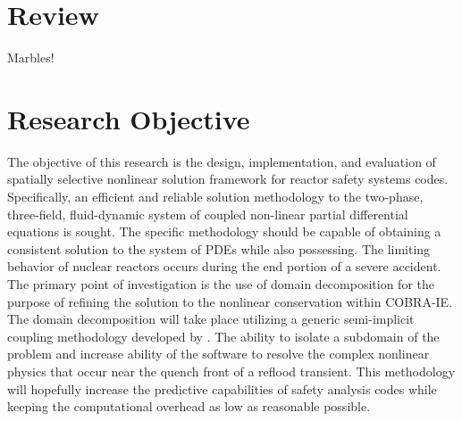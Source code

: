 \section{Review}
\label{sect:review}
Marbles!
\section{Research Objective}
The objective of this research is the design, implementation, and evaluation of spatially selective nonlinear solution framework for reactor safety systems codes.
Specifically, an efficient and reliable solution methodology to the two-phase, three-field, fluid-dynamic system of coupled non-linear partial differential equations is sought.
The specific methodology should be capable of obtaining a consistent solution to the system of PDEs while also possessing.
\cite{Aktas1996}
The limiting behavior of nuclear reactors occurs during the end portion of a severe accident.
The primary point of investigation is the use of domain decomposition for the purpose of refining the solution to the nonlinear conservation within COBRA-IE.
The domain decomposition will take place utilizing a generic semi-implicit coupling methodology developed by \citet{Weaver2002}.
The ability to isolate a subdomain of the problem and increase ability of the software to resolve the complex nonlinear physics that occur near the quench front of a reflood transient.
This methodology will hopefully increase the predictive capabilities of safety analysis codes while keeping the computational overhead as low as reasonable possible.